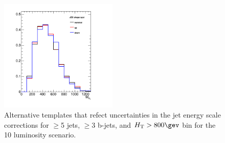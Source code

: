 %
%
\begin{figure}[]
  \centering
  \includegraphics[width=0.5\textwidth]{figures/closureTests/mhtJetSyst_SMS_T1bbbb_2J_mGl1000_mLSP900_JEC_ge3b_ge5j_800_1600.png}
  \caption{\label{fig:jec-shape} Alternative \mht templates that
    refect uncertainties in the jet energy scale corrections for
    $\geq$5 jets, $\geq$3 b-jets, and $\scalht > 800\gev$ bin for the
    10 \ifb luminosity scenario.}
\end{figure}
%
%
%
%
%
%
%
%
%
%
